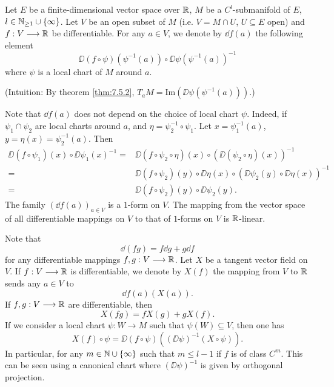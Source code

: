 \begin{exampleenv}[Definition]
    Let $E$ be a finite-dimensional vector space over $\mathbb{R}$, $M$ be a $C^l$-submanifold of $E$, $l \in \mathbb{N}_{\ge 1} \cup \{\infty\}$.
    Let $V$ be an open subset of $M$ (i.e. $V = M \cap U$, $U \subseteq E$ open) and $f : V \longrightarrow \mathbb{R}$ be differentiable.
    For any $a \in V$, we denote by $\dd f(a)$ the following element
    $$\DD (f \circ \psi) (\psi^{-1}(a)) \circ \DD \psi(\psi^{-1}(a))^{-1}$$
    where $\psi$ is a local chart of $M$ around $a$.

    (Intuition: By theorem \ref{thm:7.5.2}, $T_a M = \mathrm{Im}(\DD \psi (\psi^{-1}(a)))$.)

    Note that $\dd f(a)$ does not depend on the choice of local chart $\psi$.
    Indeed, if $\psi_1 \cap \psi_2$ are local charts around $a$, and $\eta = \psi^{-1}_2 \circ \psi_1$.
    Let $x = \psi^{-1}_1(a)$, $y = \eta(x) = \psi^{-1}_2(a)$.
    Then
    $$\begin{aligned}
        \DD(f \circ \psi_1)(x) \circ \DD \psi_1(x)^{-1} = & \DD(f \circ \psi_2 \circ \eta)(x) \circ \left(\DD(\psi_2 \circ \eta)(x)\right)^{-1}\\
        = & \DD(f \circ \psi_2)(y) \circ \DD \eta(x) \circ \left(\DD \psi_2(y) \circ \DD \eta (x)\right)^{-1}\\
        = & \DD(f \circ \psi_2)(y) \circ \DD \psi_2 (y).
    \end{aligned}$$
    The family $(\dd f(a))_{a \in V}$ is a $1$-form on $V$.
    The mapping from the vector space of all differentiable mappings on $V$ to that of $1$-forms on $V$ is $\mathbb{R}$-linear.

    \quad Note that
    $$\dd (f g) = f \dd g + g \dd f$$
    for any differentiable mappings $f,g: V \longrightarrow \mathbb{R}$.
    Let $X$ be a tangent vector field on $V$.
    If $f: V \longrightarrow \mathbb{R}$ is differentiable, we denote by $X(f)$ the mapping from $V$ to $\mathbb{R}$ sends any $a \in V$ to
    $$\dd f (a)(X(a)).$$
    If $f,g : V \longrightarrow \mathbb{R}$ are differentiable, then 
    $$X(fg) = f X(g) + g X(f).$$
    If we consider a local chart $\psi : W \longrightarrow M$ such that $\psi(W) \subseteq V$,
    then one has
    $$X(f) \circ \psi = \DD (f \circ \psi)((\DD \psi)^{-1}(X \circ \psi)).$$
    In particular, for any $m \in \mathbb{N} \cup \{\infty\}$ such that $m \le l - 1$ if $f$ is of class $C^m$.
    This can be seen using a canonical chart where $(\DD \psi)^{-1}$ is given by orthogonal projection.
    \begin{figure}[H]
        \centering



\end{figure}
\end{exampleenv}

